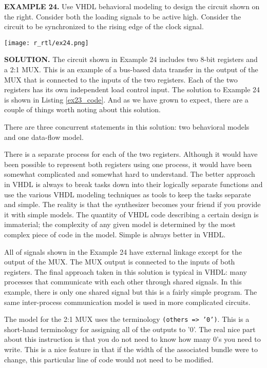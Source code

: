 \begin{leftbar}
\begin{minipage}[t]{0.5\textwidth}
\vspace{10pt}
\noindent
\textbf{EXAMPLE 24.}
Use VHDL behavioral modeling to design the circuit shown on the right. Consider both the loading signals to be active high. Consider the circuit to be synchronized to the rising edge of the clock signal. 
\end{minipage}
\begin{minipage}[t]{0.5\textwidth}
\vspace{0pt}\raggedright
    \centering
	\texttt{[image: r\_rtl/ex24.png]}
\end{minipage}
\end{leftbar}
\noindent
\textbf{SOLUTION.} The circuit shown in Example 24 includes two 8-bit registers and a 2:1 MUX. This is an example of a bus-based data transfer in the output of the MUX that is connected to the inputs of the two registers. Each of the two registers has its own independent load control input. The solution to Example 24 is shown in Listing \ref{ex23_code}. And as we have grown to expect, there are a couple of things worth noting about this solution. 
\begin{my_list}
\item There are three concurrent statements in this solution: two behavioral models and one data-flow model. 

\item There is a separate process for each of the two registers. Although it would have been possible to represent both registers using one process, it would have been somewhat complicated and somewhat hard to understand. The better approach in VHDL is always to break tasks down into their logically separate functions and use the various VHDL modeling techniques as tools to keep the tasks separate and simple. The reality is that the synthesizer becomes your friend if you provide it with simple models. The quantity of VHDL code describing a certain design is immaterial; the complexity of any given model is determined by the most complex piece of code in the model. Simple is always better in VHDL.

\item All of signals shown in the Example 24 have external linkage except for the output of the MUX. The MUX output is connected to the inputs of both registers. The final approach taken in this solution is typical in VHDL: many processes that communicate with each other through shared signals. In this example, there is only one shared signal but this is a fairly simple program. The same inter-process communication model is used in more complicated circuits.

\item The model for the 2:1 MUX uses the terminology \texttt{(others => '0')}. This is a short-hand terminology for assigning all of the outputs to '0'. The real nice part about this instruction is that you do not need to know how many 0’s you need to write. This is a nice feature in that if the width of the associated bundle were to change, this particular line of code would not need to be modified. 
\end{my_list}

